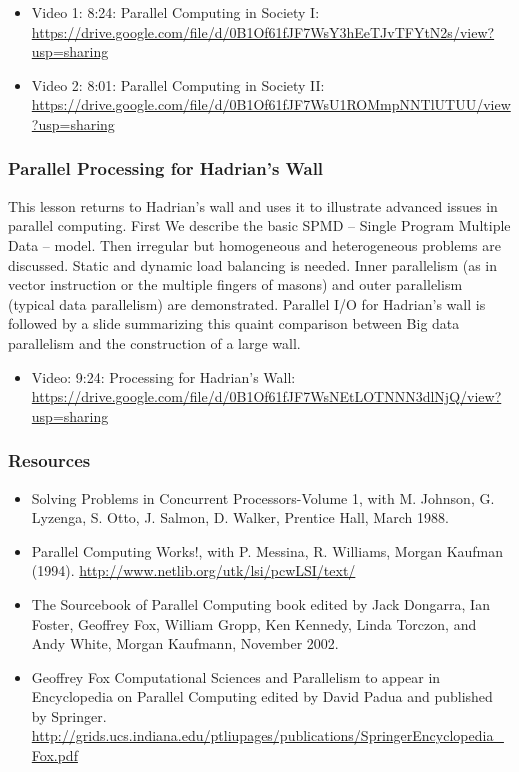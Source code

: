 \begin{itemize}
\tightlist
\item
  Video 1: 8:24: Parallel Computing in Society I:
  \url{https://drive.google.com/file/d/0B1Of61fJF7WsY3hEeTJvTFYtN2s/view?usp=sharing}
\item
  Video 2: 8:01: Parallel Computing in Society II:
  \url{https://drive.google.com/file/d/0B1Of61fJF7WsU1ROMmpNNTlUTUU/view?usp=sharing}
\end{itemize}

\subsubsection{Parallel Processing for Hadrian's Wall}

This lesson returns to Hadrian's wall and uses it to illustrate advanced
issues in parallel computing. First We describe the basic SPMD -- Single
Program Multiple Data -- model. Then irregular but homogeneous and
heterogeneous problems are discussed. Static and dynamic load balancing
is needed. Inner parallelism (as in vector instruction or the multiple
fingers of masons) and outer parallelism (typical data parallelism) are
demonstrated. Parallel I/O for Hadrian's wall is followed by a slide
summarizing this quaint comparison between Big data parallelism and the
construction of a large wall.

\begin{itemize}
\tightlist
\item
  Video: 9:24: Processing for Hadrian's Wall:
  \url{https://drive.google.com/file/d/0B1Of61fJF7WsNEtLOTNNN3dlNjQ/view?usp=sharing}
\end{itemize}

\subsubsection{Resources}\label{resources}

\begin{itemize}
\tightlist
\item
  Solving Problems in Concurrent Processors-Volume 1, with M. Johnson,
  G. Lyzenga, S. Otto, J. Salmon, D. Walker, Prentice Hall, March 1988.
\item
  Parallel Computing Works!, with P. Messina, R. Williams, Morgan
  Kaufman (1994). \url{http://www.netlib.org/utk/lsi/pcwLSI/text/}
\item
  The Sourcebook of Parallel Computing book edited by Jack Dongarra, Ian
  Foster, Geoffrey Fox, William Gropp, Ken Kennedy, Linda Torczon, and
  Andy White, Morgan Kaufmann, November 2002.
\item
  Geoffrey Fox Computational Sciences and Parallelism to appear in
  Encyclopedia on Parallel Computing edited by David Padua and published
  by Springer.
  \url{http://grids.ucs.indiana.edu/ptliupages/publications/SpringerEncyclopedia_Fox.pdf}
\end{itemize}

